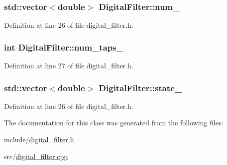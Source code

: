 \hypertarget{class_digital_filter_abf0263de2d7837bdc002615d3d7ca365}{}
\subsubsection[{num\+\_\+}]{\setlength{\rightskip}{0pt plus 5cm}std\+::vector$<$double$>$ Digital\+Filter\+::num\+\_\+\hspace{0.3cm}{\ttfamily [protected]}}\label{class_digital_filter_abf0263de2d7837bdc002615d3d7ca365}


Definition at line 26 of file digital\+\_\+filter.\+h.

\hypertarget{class_digital_filter_ad9099f4f1da3f23988591b9e733861d7}{}
\subsubsection[{num\+\_\+taps\+\_\+}]{\setlength{\rightskip}{0pt plus 5cm}int Digital\+Filter\+::num\+\_\+taps\+\_\+\hspace{0.3cm}{\ttfamily [protected]}}\label{class_digital_filter_ad9099f4f1da3f23988591b9e733861d7}


Definition at line 27 of file digital\+\_\+filter.\+h.

\hypertarget{class_digital_filter_a0fe7f91edef50acb1d8fb68957b71129}{}
\subsubsection[{state\+\_\+}]{\setlength{\rightskip}{0pt plus 5cm}std\+::vector$<$double$>$ Digital\+Filter\+::state\+\_\+\hspace{0.3cm}{\ttfamily [protected]}}\label{class_digital_filter_a0fe7f91edef50acb1d8fb68957b71129}


Definition at line 26 of file digital\+\_\+filter.\+h.



The documentation for this class was generated from the following files\+:\begin{DoxyCompactItemize}
\item 
include/\hyperlink{digital__filter_8h}{digital\+\_\+filter.\+h}\item 
src/\hyperlink{digital__filter_8cpp}{digital\+\_\+filter.\+cpp}\end{DoxyCompactItemize}
